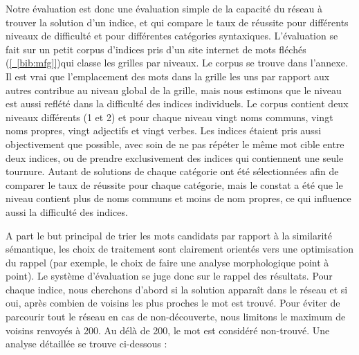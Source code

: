 Notre évaluation est donc une évaluation simple de la capacité du réseau à 
trouver la solution d'un indice, et qui compare le taux de réussite pour 
différents niveaux de difficulté et pour différentes catégories syntaxiques. 
L'évaluation se fait sur un petit corpus d'indices pris d'un site internet de 
mots fléchés (\hyperref[bib:mfg]{[~\ref*{bib:mfg}]})qui classe les grilles par 
niveaux. Le corpus se trouve dans l'annexe. Il est vrai 
que l'emplacement des mots dans la grille les uns par rapport aux autres 
contribue au niveau global de la grille, mais nous estimons que le niveau est 
aussi reflété dans la difficulté des indices individuels. Le corpus contient 
deux niveaux différents (1 et 2) et pour chaque niveau vingt noms communs, vingt 
noms propres, vingt adjectifs et vingt verbes. Les indices étaient pris aussi 
objectivement que possible, avec soin de ne pas répéter le même mot cible entre 
deux indices, ou de prendre exclusivement des indices qui contiennent une seule 
tournure. Autant de solutions de chaque catégorie ont été sélectionnées afin de 
comparer le taux de réussite pour chaque catégorie, mais le constat a été que le 
niveau contient plus de noms communs et moins de nom propres, ce qui influence 
aussi la difficulté des indices.

A part le but principal de trier les mots candidats par rapport à la similarité sémantique, les choix de traitement sont clairement orientés vers une optimisation du rappel (par exemple, le choix de faire une analyse morphologique point à point). Le système d'évaluation se juge donc sur le rappel des résultats. Pour chaque indice, nous cherchons d'abord si la solution apparaît dans le réseau et si oui, après combien de voisins les plus proches le mot est trouvé. Pour éviter de parcourir tout le réseau en cas de non-découverte, nous limitons le maximum de voisins renvoyés à 200. Au délà de 200, le mot est considéré non-trouvé. Une analyse détaillée se trouve ci-dessous :


